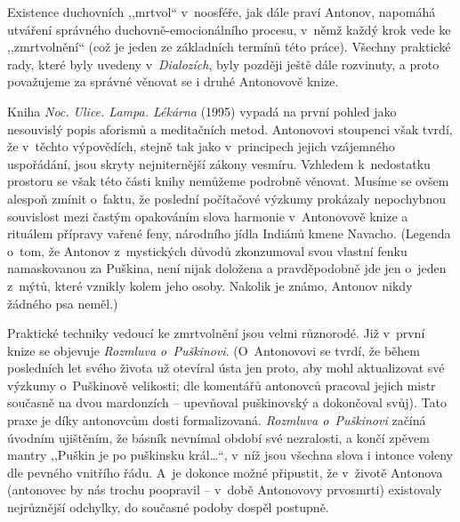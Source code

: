 \begin{pairs}
\begin{Rightside}
\pstart
Existence duchovních ,,mrtvol`` v~noosféře, jak dále praví Antonov, napomáhá utváření správného duchovně-emocionálního procesu, v~němž každý krok vede ke ,,zmrtvolnění`` (což je jeden ze základních termínů této práce). Všechny praktické rady, které byly uvedeny v~\textit{Dialozích}, byly později ještě dále rozvinuty, a proto považujeme za správné věnovat se i druhé Antonovově knize.
\pend

\pstart
Kniha \textit{Noc. Ulice. Lampa. Lékárna} (1995) vypadá na první pohled jako nesouvislý popis aforismů a meditačních metod. Antonovovi stoupenci však tvrdí, že v~těchto výpovědích, stejně tak jako v~principech jejich vzájemného uspořádání, jsou skryty nejniternější zákony vesmíru. Vzhledem k~nedostatku prostoru se však této části knihy nemůžeme podrobně věnovat. Musíme se ovšem alespoň zmínit o~faktu, že poslední počítačové výzkumy prokázaly nepochybnou souvislost mezi častým opakováním slova harmonie v~Antonovově knize a rituálem přípravy vařené feny, národního jídla Indiánů kmene Navacho. (Legenda o~tom, že Antonov z~mystických důvodů zkonzumoval svou vlastní fenku namaskovanou za Puškina, není nijak doložena a pravděpodobně jde jen o~jeden z~mýtů, které vznikly kolem jeho osoby. Nakolik je známo, Antonov nikdy žádného psa neměl.)
\pend

\pstart
Praktické techniky vedoucí ke zmrtvolnění jsou velmi různorodé. Již v~první knize se objevuje \textit{Rozmluva o~Puškinovi}. (O~Antonovovi se tvrdí, že během posledních let svého života už otevíral ústa jen proto, aby mohl aktualizovat své výzkumy o~Puškinově velikosti; dle komentářů antonovců pracoval jejich mistr současně na dvou mardonzích -- upevňoval puškinovský a dokončoval svůj). Tato praxe je díky antonovcům dosti formalizovaná. \textit{Rozmluva o~Puškinovi} začíná úvodním ujištěním, že básník nevnímal období své nezralosti, a končí zpěvem mantry ,,Puškin je po puškinsku král\dots``, v~níž jsou všechna slova i intonce voleny dle pevného vnitřího řádu. A~je dokonce možné připustit, že v~životě Antonova (antonovec by nás trochu poopravil -- v~době Antonovovy prvosmrti) existovaly nejrůznější odchylky, do současné podoby dospěl postupně.
\pend
\endnumbering
\end{Rightside}
\Columns
\end{pairs}

